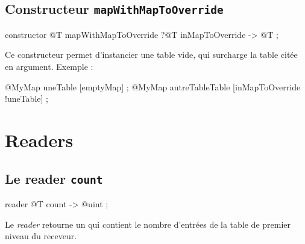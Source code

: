  

\subsection{Constructeur \texttt{mapWithMapToOverride}}

\begin{galgascode}
constructor @T mapWithMapToOverride ?@T inMapToOverride -> @T ;
\end{galgascode}

Ce constructeur permet d'instancier une table vide, qui surcharge la table  citée en argument. Exemple :
\begin{galgascode}
@MyMap uneTable [emptyMap] ;
@MyMap autreTableTable [inMapToOverride !uneTable] ;
\end{galgascode}

\section{Readers}

%
%

\subsection{Le reader \texttt{count}}

\begin{galgascode}
reader @T count -> @uint ;
\end{galgascode}


Le \emph{reader}  retourne un  qui contient le nombre d'entrées de la table de premier niveau du receveur.



